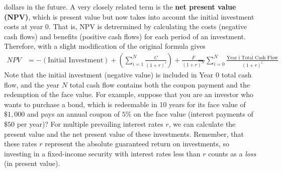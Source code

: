 \documentclass{article}
\begin{document}
    dollars in the future. A very closely related term is the \textbf{net present value (NPV)}, which is present value but now takes into account the initial investment costs at year $0$. That is, NPV is detrermined by calculating the costs (negative cash flows) and benefits (positive cash flows) for each period of an investment. Therefore, with a slight modification of the original formula gives
    \begin{align*}
      NPV & = -(\text{Initial Investment}) + \left( \sum_{i=1}^N \frac{C}{(1+r)^i} \right) + \frac{F}{(1+r)^N} \
      & = \sum_{i=0}^N \frac{\text{Year i Total Cash Flow}}{(1 + r)^i}
    \end{align*}
    Note that the initial investment (negative value) is included in Year $0$ total cash flow, and the year $N$ total cash flow contains both the coupon payment and the redemption of the face value.
    For example, suppose that you are an investor who wants to purchase a bond, which is redeemable in 10 years for its face value of $\$1,000$ and pays an annual coupon of $5\%$ on the face value (interest payments of $\$50$ per year)? For multiple prevailing interest rates $r$, we can calculate the present value and the net present value of these investments. Remember, that these rates $r$ represent the absolute guaranteed return on investments, so investing in a fixed-income security with interest rates less than $r$ counts as a \textit{loss} (in present value).
\end{document}
